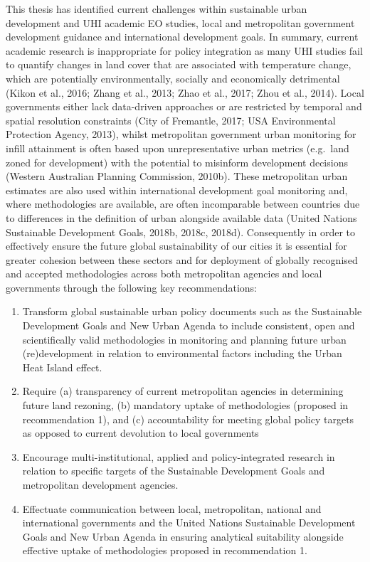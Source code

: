 \documentclass[]{book}
\begin{document}
This thesis has identified current challenges within sustainable urban
development and UHI academic EO studies, local and metropolitan
government development guidance and international development goals. In
summary, current academic research is inappropriate for policy
integration as many UHI studies fail to quantify changes in land cover
that are associated with temperature change, which are potentially
environmentally, socially and economically detrimental (Kikon et al.,
2016; Zhang et al., 2013; Zhao et al., 2017; Zhou et al., 2014). Local
governments either lack data-driven approaches or are restricted by
temporal and spatial resolution constraints (City of Fremantle, 2017;
USA Environmental Protection Agency, 2013), whilst metropolitan
government urban monitoring for infill attainment is often based upon
unrepresentative urban metrics (e.g.~land zoned for development) with
the potential to misinform development decisions (Western Australian
Planning Commission, 2010b). These metropolitan urban estimates are also
used within international development goal monitoring and, where
methodologies are available, are often incomparable between countries
due to differences in the definition of urban alongside available data
(United Nations Sustainable Development Goals, 2018b, 2018c, 2018d).
Consequently in order to effectively ensure the future global
sustainability of our cities it is essential for greater cohesion
between these sectors and for deployment of globally recognised and
accepted methodologies across both metropolitan agencies and local
governments through the following key recommendations:

\begin{enumerate}
\def\labelenumi{\arabic{enumi}.}
\item
  Transform global sustainable urban policy documents such as the
  Sustainable Development Goals and New Urban Agenda to include
  consistent, open and scientifically valid methodologies in monitoring
  and planning future urban (re)development in relation to environmental
  factors including the Urban Heat Island effect.
\item
  Require (a) transparency of current metropolitan agencies in
  determining future land rezoning, (b) mandatory uptake of
  methodologies (proposed in recommendation 1), and (c) accountability
  for meeting global policy targets as opposed to current devolution to
  local governments
\item
  Encourage multi-institutional, applied and policy-integrated research
  in relation to specific targets of the Sustainable Development Goals
  and metropolitan development agencies.
\item
  Effectuate communication between local, metropolitan, national and
  international governments and the United Nations Sustainable
  Development Goals and New Urban Agenda in ensuring analytical
  suitability alongside effective uptake of methodologies proposed in
  recommendation 1.
\end{enumerate}
\end{document}
